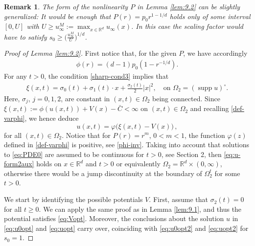 \documentclass[reqno]{amsart}
\newtheorem{remark}[lemma]{Remark}
\newcommand{\R}{\mathbb{R}}
\DeclareMathOperator{\supp}{supp}
\begin{document}
\begin{remark}
The form of the nonlinearity $P$ in Lemma \ref{lem:9.2} can be slightly generalized: It would be enough that $P(r)=p_0r^{1-1/d}$ holds only of some interval $[0,U]$ with $U\ge u_\infty^M:=\max_{x\in\R^d} u_\infty(x)$. In this case the scaling factor would have to satisfy $s_0\ge \Big(\frac{u_\infty^M}{U}\Big)^{1/d}$.
\end{remark}
%
\begin{proof}[Proof of Lemma \ref{lem:9.2}]
  First notice that, for the given $P$, we have accordingly
  \begin{align*}
    \phi(r) = (d-1)p_0(1-r^{-1/d}).
  \end{align*} 
  For any $t>0$, the  condition \eqref{sharp-cond3} implies that
  \begin{align*}
    \xi(x,t) = \sigma_0(t)+\sigma_1(t)\cdot x + \frac{\sigma_2(t)}2|x|^2,       \quad \mbox{on }\Omega_2=(\supp u)^\circ.
  \end{align*}
Here, $\sigma_j$, $j=0,1,2$, are constant in $(x,t)\in\Omega_2$ being connected. Since $\xi(x,t):=\phi(u(x,t))+V(x)-\bar C<\infty$ on $(x,t)\in\Omega_2$ and recalling \eqref{def-varphi}, we hence deduce
\begin{equation}\label{eq:u-form2aux}
  u(x,t)=\varphi\big(\xi(x,t)-V(x)\big)
  \,, 
\end{equation}
for all $(x,t)\in\Omega_2$. Notice that for $P(r)=r^m$, $0<m<1$, the function $\varphi(z)$ defined in \eqref{def-varphi} is positive, see \eqref{phi-inv}.
Taking into account that solutions to \eqref{eq:PDE0} are assumed to be continuous for $t>0$, see Section 2, then \eqref{eq:u-form2aux} holds on $x\in\R^d$ and $t>0$ or equivalently $\Omega_2=\R^d\times (0,\infty)$, otherwise there would be a jump discontinuity at the boundary of $\Omega_2^t$ for some $t>0$.


  We start by identifying the possible potentials $V$. First, assume that $\sigma_2(t)=0$ for all $t\geq 0$. We can apply the same proof as in Lemma \ref{lem:9.1}, and thus the potential satisfies \eqref{eq:Vopt}. Moreover, the conclusions about the solution $u$ in \eqref{eq:u0opt} and \eqref{eq:uopt} carry over, coinciding with \eqref{eq:u0opt2} and \eqref{eq:uopt2}  for $s_0=1$.


\end{proof}
\end{document}

